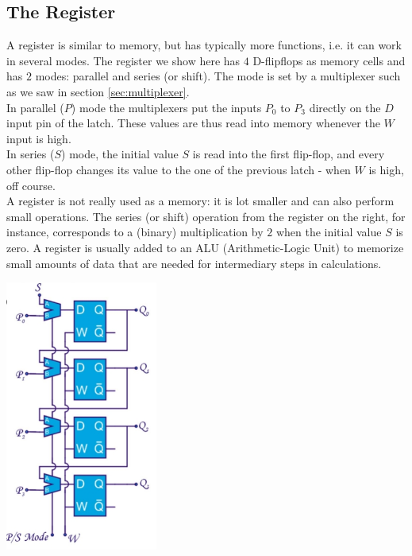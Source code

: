 \subsection{The Register}

\begin{minipage}{.6\textwidth}
	A register is similar to memory, but has typically more functions, i.e. it can work in several modes. The register we show here has $4$ D-flipflops as memory cells and has $2$ modes: parallel and series (or shift). The mode is set by a multiplexer such as we saw in section \ref{sec:multiplexer}. \\
	In parallel ($P$) mode the multiplexers put the inputs $P_0$ to $P_3$ directly on the $D$ input pin of the latch. These values are thus read into memory whenever the $W$ input is high.\\
	In series ($S$) mode, the initial value $S$ is read into the first flip-flop, and every other flip-flop changes its value to the one of the previous latch - when $W$ is high, off course. \\
	A register is not really used as a memory: it is lot smaller and can also perform small operations. The series (or shift) operation from the register on the right, for instance, corresponds to a (binary) multiplication by $2$ when the initial value $S$ is zero. A register is usually added to an ALU (Arithmetic-Logic Unit) to memorize small amounts of data that are needed for intermediary steps in calculations.
\end{minipage}
\begin{minipage}{.5\textwidth}
	\centering
	\includegraphics[width=5cm]{figures/ch17/register1.jpg}
	\label{fig:register1}
\end{minipage}%

